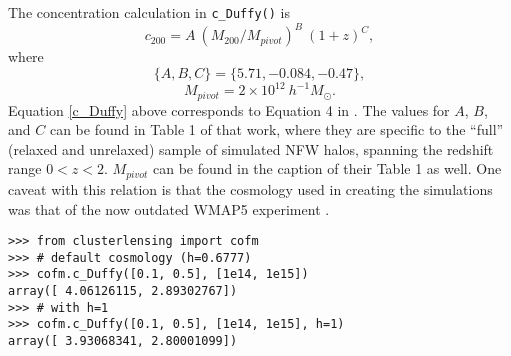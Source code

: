 \documentclass[twocolumn]{aastex6}
\newcommand{\code}{\lstinline[style=codeintext]}
\begin{document}
The concentration calculation in \code{c_Duffy()} is
\begin{equation}\label{c_Duffy}
c_{200} = A\ (M_{200} / M_{pivot})^B \ (1 + z)^C,
\end{equation}
where
\begin{equation}
\{A, B, C\} = \{5.71, -0.084, -0.47\},
\end{equation}
\begin{equation}
M_{pivot} = 2 \times 10^{12}\ h^{-1} M_\odot.
\end{equation}
Equation \ref{c_Duffy} above corresponds to Equation 4 in \citet{Duffy08}. The values for $A$, $B$, and $C$ can be found in Table 1 of that work, where they are specific to the ``full'' (relaxed and unrelaxed) sample of simulated NFW halos, spanning the redshift range $0 < z < 2$. $M_{pivot}$ can be found in the caption of their Table 1 as well. One caveat with this relation is that the cosmology used in creating the \citet{Duffy08} simulations was that of the now outdated WMAP5 experiment \citep{WMAP5}.

\begin{verbatim}
>>> from clusterlensing import cofm
>>> # default cosmology (h=0.6777)
>>> cofm.c_Duffy([0.1, 0.5], [1e14, 1e15])
array([ 4.06126115, 2.89302767])
>>> # with h=1
>>> cofm.c_Duffy([0.1, 0.5], [1e14, 1e15], h=1)
array([ 3.93068341, 2.80001099])
\end{verbatim}
\end{document}

